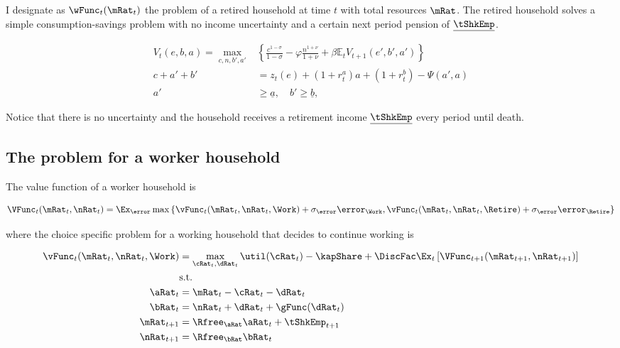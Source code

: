 \documentclass{article}
\begin{document}
I designate as $\wFunc_{t}(\mRat_{t})$ the problem of a retired household at time $t$ with total resources $\mRat$. The retired household solves a simple consumption-savings problem with no income uncertainty and a certain next period pension of $\underline{\tShkEmp}$.

\begin{align} \tag{1}
    V_t(e, b, a) = \max_{c, n, b', a'} & \left\{\frac{c^{1-\sigma}}{1-\sigma} - \varphi \frac{n^{1+\nu}}{1+\nu} + \beta \mathbb{E}_t V_{t+1}(e', b', a') \right\}
    \\
    c + a' + b'                        & = z_t(e) + (1 + r_t^a)a + (1 + r_t^b) - \Psi(a', a)
    \\
    a'                                 & \geq \underline{a}, \quad b' \geq \underline{b},
\end{align}

Notice that there is no uncertainty and the household receives a retirement income $\underline{\tShkEmp}$ every period until death.

\subsection{The problem for a worker household}

The value function of a worker household is

\begin{equation}
\VFunc_{t}(\mRat_{t}, \nRat_{t}) = \Ex_\error \max \left\{
    \vFunc_{t}(\mRat_{t}, \nRat_{t}, \Work) + \sigma_{\error}
    \error_{\Work} ,
    \vFunc_{t}(\mRat_{t}, \nRat_{t}, \Retire) + \sigma_{\error}
    \error_{\Retire} \right\}
\end{equation}

where the choice specific problem for a working household that decides to continue working is

\begin{equation}
\begin{split}
        \vFunc_{t}(\mRat_{t}, \nRat_{t}, \Work) & = \max_{\cRat_{t},
            \dRat_{t}} \util(\cRat_{t}) - \kapShare + \DiscFac
        \Ex_{t} \left[
            \VFunc_{t+1}(\mRat_{t+1}, \nRat_{t+1})
            \right] \\
        & \text{s.t.} \\
        \aRat_{t} & = \mRat_{t} - \cRat_{t} - \dRat_{t} \\
        \bRat_{t} & = \nRat_{t} + \dRat_{t} + \gFunc(\dRat_{t}) \\
        \mRat_{t+1} & = \Rfree_{\aRat} \aRat_{t} + \tShkEmp_{t+1} \\
        \nRat_{t+1} & = \Rfree_{\bRat} \bRat_{t}
    \end{split}
\end{equation}
\end{document}
